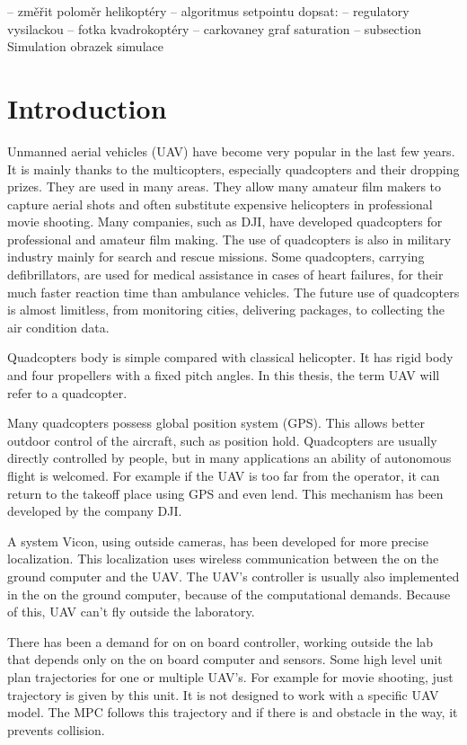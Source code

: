 \documentclass[a4paper,11pt,titlepage]{article}
\begin{document}
-- změřit poloměr helikoptéry
-- algoritmus setpointu
dopsat:
-- regulatory vysilackou
-- fotka kvadrokoptéry
-- carkovaney graf saturation
-- subsection Simulation obrazek simulace


\section{Introduction}
Unmanned aerial vehicles (UAV) have become very popular in the last few years. It is mainly thanks to the multicopters, especially quadcopters and their dropping prizes. They are used in many areas. They allow many amateur film makers to capture aerial shots and often substitute expensive helicopters in professional movie shooting. Many companies, such as DJI, have developed quadcopters for professional and amateur film making. The use of quadcopters is also in military industry mainly for search and rescue missions. Some quadcopters, carrying defibrillators, are used for medical assistance in cases of heart failures, for their much faster reaction time than ambulance vehicles. The future use of quadcopters is almost limitless, from monitoring cities, delivering packages, to collecting the air condition data. 

Quadcopters body is simple compared with classical helicopter. It has rigid body and four propellers with a fixed pitch angles. In this thesis, the term UAV will refer to a quadcopter.

Many quadcopters possess global position system (GPS). This allows better outdoor control of the aircraft, such as position hold. Quadcopters are usually directly controlled by people, but in many applications an ability of autonomous flight is welcomed. For example if the UAV is too far from the operator, it can return to the takeoff place using GPS and even lend. This mechanism has been developed by the company DJI. 

A system Vicon, using outside cameras, has been developed for more precise localization. This localization uses wireless communication between the on the ground computer and the UAV. The UAV's controller is usually also implemented in the on the ground computer, because of the computational demands. Because of this, UAV can't fly outside the laboratory. 

There has been a demand for on on board controller, working outside the lab that depends only on the on board computer and sensors. Some high level unit plan trajectories for one or multiple UAV's. For example for movie shooting, just trajectory is given by this unit. It is not designed to work with a specific UAV model. The MPC follows this trajectory and if there is and obstacle in the way, it prevents collision.
\end{document}
